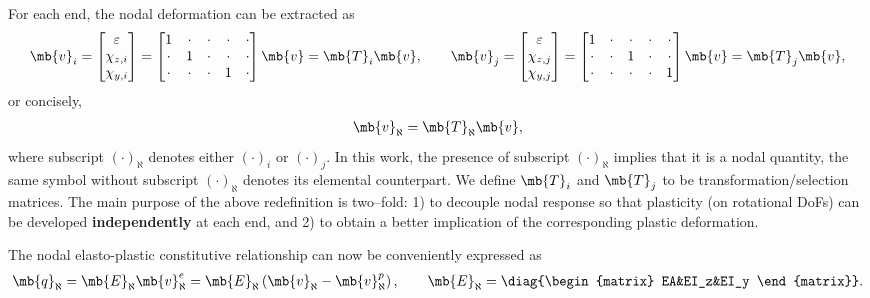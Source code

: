 For each end, the nodal deformation can be extracted as
\begin{gather}
\mb{v}_i=\begin{bmatrix}
\varepsilon\\\chi_{z,i}\\\chi_{y,i}
\end{bmatrix}=\begin{bmatrix}
1&\cdot&\cdot&\cdot&\cdot\\
\cdot&1&\cdot&\cdot&\cdot\\
\cdot&\cdot&\cdot&1&\cdot
\end{bmatrix}\mb{v}=\mb{T}_i\mb{v},\qquad
\mb{v}_j=\begin{bmatrix}
\varepsilon\\\chi_{z,j}\\\chi_{y,j}
\end{bmatrix}=\begin{bmatrix}
1&\cdot&\cdot&\cdot&\cdot\\
\cdot&\cdot&1&\cdot&\cdot\\
\cdot&\cdot&\cdot&\cdot&1
\end{bmatrix}\mb{v}=\mb{T}_j\mb{v},
\end{gather}
or concisely,
\begin{gather}
\mb{v}_\aleph=\mb{T}_\aleph\mb{v},
\end{gather}
where subscript $\left(\cdot\right)_\aleph$ denotes either $\left(\cdot\right)_i$ or $\left(\cdot\right)_j$. In this work, the presence of subscript $\left(\cdot\right)_\aleph$ implies that it is a nodal quantity, the same symbol without subscript $\left(\cdot\right)_\aleph$ denotes its elemental counterpart. We define $\mb{T}_i$ and $\mb{T}_j$ to be transformation/selection matrices. The main purpose of the above redefinition is two--fold: 1) to decouple nodal response so that plasticity (on rotational DoFs) can be developed \textbf{independently} at each end, and 2) to obtain a better implication of the corresponding plastic deformation.

The nodal elasto-plastic constitutive relationship can now be conveniently expressed as
\begin{gather}
\mb{q}_\aleph=\mb{E}_\aleph\mb{v}_\aleph^e=\mb{E}_\aleph\left(\mb{v}_\aleph-\mb{v}_\aleph^p\right),\qquad\mb{E}_\aleph=\diag{\begin{matrix}
EA&EI_z&EI_y
\end{matrix}}.
\end{gather}

